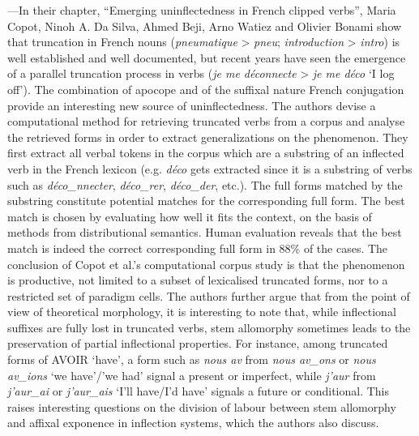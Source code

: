 \documentclass[output=paper]{langscibook}
\begin{document}
---In their chapter, ``Emerging uninflectedness in French clipped verbs'', Maria Copot, Ninoh A. Da Silva, Ahmed Beji, Arno Watiez and Olivier Bonami show that truncation in French nouns (\emph{pneumatique} \textgreater{} \emph{pneu}; \emph{introduction} \textgreater{} \emph{intro}) is well established and well documented, but recent years have seen the emergence of a parallel truncation process in verbs (\emph{je me déconnecte} \textgreater{} \emph{je me déco} `I log off'). The combination of apocope and of the suffixal nature French conjugation provide an interesting new source of uninflectedness. The authors devise a computational method for retrieving truncated verbs from a corpus and analyse the retrieved forms in order to extract generalizations on the phenomenon. They first extract all verbal tokens in the corpus which are a substring of an inflected verb in the French lexicon (e.g. \emph{déco} gets extracted since it is a substring of verbs such as \emph{déco\_nnecter}, \emph{déco\_rer}, \emph{déco\_der}, etc.). The full forms matched by the substring constitute potential matches for the corresponding full form. The best match is chosen by evaluating how well it fits the context, on the basis of methods from distributional semantics. Human evaluation	reveals that the best match is indeed the correct corresponding full form in 88\% of the cases. The conclusion of Copot et al.'s computational corpus study is that the phenomenon is productive, not limited to a subset of lexicalised truncated forms, nor to a restricted set of paradigm cells. The authors further argue that from the point of view of theoretical morphology, it is interesting to note that, while inflectional suffixes are fully lost in truncated verbs, stem allomorphy sometimes leads to the preservation of partial inflectional properties. For instance, among truncated forms of AVOIR `have', a form such as \emph{nous av} from \emph{nous av­\_ons} or \emph{nous av\_ions} `we have'/'we had' signal a present or imperfect, while \emph{j'aur} from \emph{j'aur\_ai} or \emph{j'aur\_ais} `I'll have/I'd have' signals a future or conditional. This raises interesting questions on the division of labour between stem allomorphy and affixal exponence in inflection systems, which the authors also discuss.
\end{document}
